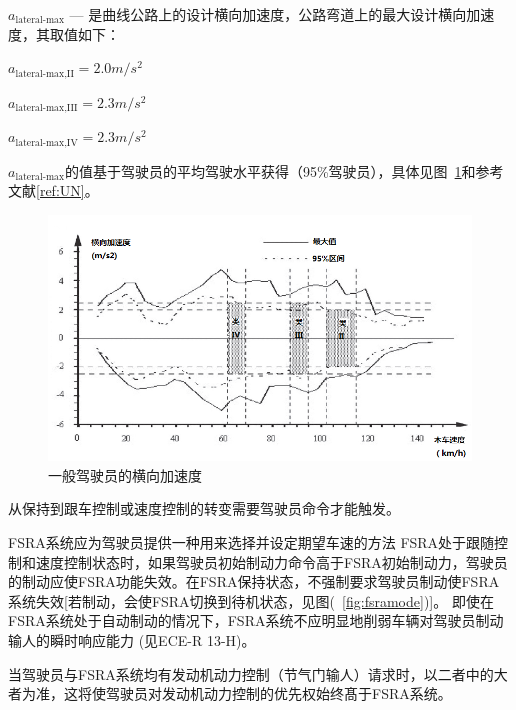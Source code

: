 \documentclass[is,copyright,is]{isov2}
\begin{document}
$a_\text{lateral-max}$ --- 是曲线公路上的设计横向加速度，公路弯道上的最大设计横向加速度，其取值如下：

$ a_\text{lateral-max,II} = 2.0 \si{m/s^2}$

$ a_\text{lateral-max,III} = 2.3 \si{m/s^2}$

$ a_\text{lateral-max,IV} = 2.3 \si{m/s^2}$

$a_\text{lateral-max}$的值基于驾驶员的平均驾驶水平获得（95\%驾驶员），具体见图~\ref{fig:lateralacceleration}和参考文献\ref{ref:UN}。
\begin{figure}[htbp]
	\centering
	\includegraphics[width=0.6\linewidth]{figures/lateralacceleration}
	\caption{一般驾驶员的横向加速度}
	\label{fig:lateralacceleration}
\end{figure}

从保持到跟车控制或速度控制的转变需要驾驶员命令才能触发。


\sssclause{}
FSRA系统应为驾驶员提供一种用来选择并设定期望车速的方法
\sssclause{}
FSRA处于跟随控制和速度控制状态时，如果驾驶员初始制动力命令高于FSRA初始制动力，驾驶员的制动应使FSRA功能失效。在FSRA保持状态，不强制要求驾驶员制动使FSRA系统失效[若制动，会使FSRA切换到待机状态，见图(~\ref{fig:fsramode})]。
\sssclause{}
即使在FSRA系统处于自动制动的情况下，FSRA系统不应明显地削弱车辆对驾驶员制动输人的瞬时响应能力 (见ECE-R 13-H)。

\sssclause{}
当驾驶员与FSRA系统均有发动机动力控制（节气门输人）请求时，以二者中的大者为准，这将使驾驶员对发动机动力控制的优先权始终髙于FSRA系统。
\end{document}
